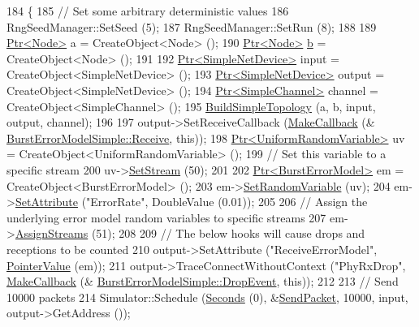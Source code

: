 \begin{DoxyCode}
184 \{
185   \textcolor{comment}{// Set some arbitrary deterministic values}
186   RngSeedManager::SetSeed (5);
187   RngSeedManager::SetRun (8);
188 
189   \hyperlink{classns3_1_1Ptr}{Ptr<Node>} a = CreateObject<Node> ();
190   \hyperlink{classns3_1_1Ptr}{Ptr<Node>} \hyperlink{buildings__pathloss_8m_a21ad0bd836b90d08f4cf640b4c298e7c}{b} = CreateObject<Node> ();
191 
192   \hyperlink{classns3_1_1Ptr}{Ptr<SimpleNetDevice>} input = CreateObject<SimpleNetDevice> ();
193   \hyperlink{classns3_1_1Ptr}{Ptr<SimpleNetDevice>} output = CreateObject<SimpleNetDevice> ();
194   \hyperlink{classns3_1_1Ptr}{Ptr<SimpleChannel>} channel = CreateObject<SimpleChannel> ();
195   \hyperlink{error-model-test-suite_8cc_af6fe24088bb4cfa248fc1b0bad6e1dfc}{BuildSimpleTopology} (a, b, input, output, channel);
196 
197   output->SetReceiveCallback (\hyperlink{group__makecallbackmemptr_ga9376283685aa99d204048d6a4b7610a4}{MakeCallback} (&
      \hyperlink{classBurstErrorModelSimple_a309f11897a4c3c6d45966760cd3b4ed2}{BurstErrorModelSimple::Receive}, \textcolor{keyword}{this}));
198   \hyperlink{classns3_1_1Ptr}{Ptr<UniformRandomVariable>} uv = CreateObject<UniformRandomVariable> ();
199   \textcolor{comment}{// Set this variable to a specific stream}
200   uv->\hyperlink{classns3_1_1RandomVariableStream_add11aaf975607746b7e271d300659a94}{SetStream} (50);
201 
202   \hyperlink{classns3_1_1Ptr}{Ptr<BurstErrorModel>} em = CreateObject<BurstErrorModel> ();
203   em->\hyperlink{classns3_1_1BurstErrorModel_a12c57e987f27335fad1c023607778795}{SetRandomVariable} (uv);
204   em->\hyperlink{classns3_1_1ObjectBase_ac60245d3ea4123bbc9b1d391f1f6592f}{SetAttribute} (\textcolor{stringliteral}{"ErrorRate"}, DoubleValue (0.01));
205 
206   \textcolor{comment}{// Assign the underlying error model random variables to specific streams}
207   em->\hyperlink{classns3_1_1BurstErrorModel_ae054a2275b29a6b0405bb63756b4e6b9}{AssignStreams} (51);
208 
209   \textcolor{comment}{// The below hooks will cause drops and receptions to be counted}
210   output->SetAttribute (\textcolor{stringliteral}{"ReceiveErrorModel"}, \hyperlink{classns3_1_1PointerValue}{PointerValue} (em));
211   output->TraceConnectWithoutContext (\textcolor{stringliteral}{"PhyRxDrop"}, \hyperlink{group__makecallbackmemptr_ga9376283685aa99d204048d6a4b7610a4}{MakeCallback} (&
      \hyperlink{classBurstErrorModelSimple_a9c52c5097ecffd47e4537e6e41fd748c}{BurstErrorModelSimple::DropEvent}, \textcolor{keyword}{this}));
212 
213   \textcolor{comment}{// Send 10000 packets}
214   Simulator::Schedule (\hyperlink{group__timecivil_ga33c34b816f8ff6628e33d5c8e9713b9e}{Seconds} (0), &\hyperlink{error-model-test-suite_8cc_a9bb9e47042238c65657a8e00cd67f111}{SendPacket}, 10000, input, output->GetAddress ());

\end{DoxyCode}
